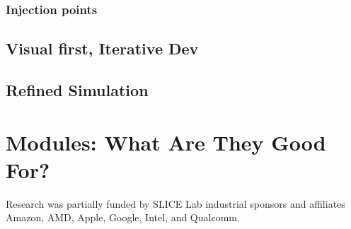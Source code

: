 \documentclass[sigplan,review,nonacm]{acmart}
\begin{document}
\subsubsection{Injection points}


\subsection{Visual first, Iterative Dev}

\subsection{Refined Simulation}


\section{Modules: What Are They Good For?}

\begin{acks}
Research was partially funded by SLICE Lab industrial sponsors and affiliates Amazon, AMD, Apple, Google, Intel, and Qualcomm.
\end{acks}




\end{document}
